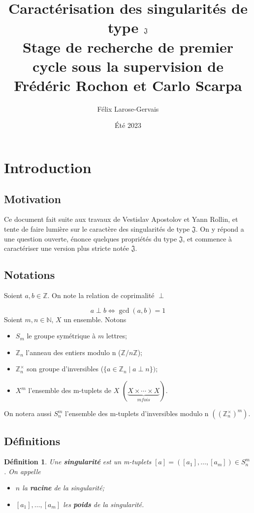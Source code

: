 \documentclass{article}
\title{%
    Caractérisation des singularités de type $\J$ \\ [2ex]
    \large Stage de recherche de premier cycle sous la supervision de \\
    Frédéric Rochon et Carlo Scarpa}
\author{Félix Larose-Gervais}
\date{Été 2023}
\newtheorem{definition}{Définition}
\newcommand{\J}{\mathfrak{J}}
\newcommand{\JS}{\overline{\J}}
\begin{document}
\maketitle

\tableofcontents

\newpage

\section{Introduction}

\subsection{Motivation}

Ce document fait suite aux travaux\cite{apostolov2016ale} de Vestislav Apostolov et Yann Rollin, 
et tente de faire lumière sur le caractère des singularités de type $\J$.
On y répond a une question ouverte, énonce quelques propriétés du type $\J$, et commence à caractériser 
une version plus stricte notée $\JS$.

\subsection{Notations}

Soient $a, b \in \mathbb{Z}$. On note la relation de coprimalité $\perp$

\[ a \perp b \iff \gcd(a, b) = 1 \]
Soient $m, n \in \mathbb{N}$, $X$ un ensemble. Notons 

\begin{itemize}
    \item $S_m$ le groupe symétrique à $m$ lettres;
    \item $\mathbb{Z}_n$ l'anneau des entiers modulo n ($\mathbb{Z}/n\mathbb{Z}$);
    \item $\mathbb{Z}_n^\times$ son groupe d'inversibles ($\{ a \in \mathbb{Z}_n \mid a \perp n \})$;
    \item $X^m$ l'ensemble des m-tuplets de $X$ $(\underbrace{X \times \cdots \times X}_{m fois})$.
\end{itemize}
On notera aussi $S_n^m$ l'ensemble des m-tuplets d'inversibles modulo n $({({\mathbb{Z}_n^\times})}^m)$.

\subsection{Définitions}

\begin{definition}
    Une \textbf{singularité} est un m-tuplets $[a] = ([a_1], \dots, [a_m]) \in S_n^m$. On appelle \begin{itemize}
        \item $n$ la \textbf{racine} de la singularité;
        \item $[a_1], \dots, [a_m]$ les \textbf{poids} de la singularité.
    \end{itemize}
\end{definition}
\end{document}
